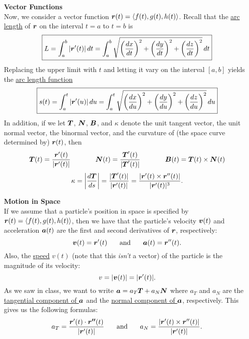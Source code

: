 \documentclass[12pt]{article}
\newcommand{\sectitle}[1]{\vspace{7.5mm}\noindent\textbf{\Large{#1}}\\[3mm]}
\newcommand{\compslong}[3]{\langle #1, #2, #3\rangle}
\begin{document}
	\sectitle{Vector Functions}
	Now, we consider a vector function $\vect{r}(t)=\compslong{f(t)}{g(t)}{h(t)}$. Recall that the \ul{arc length} of $\boldsymbol{r}$ on the interval $t=a$ to $t=b$ is
	$$\boxed{L=\int_a^b|\vect{r}'(t)|\,dt = \int_a^b\sqrt{\left(\frac{dx}{dt}\right)^2+\left(\frac{dy}{dt}\right)^2+\left(\frac{dz}{dt}\right)^2}\,dt}\vspace{3mm}$$
	Replacing the upper limit with $t$ and letting it vary on the interval $[a,b]$ yields the \ul{arc length function}
	$$\boxed{s(t)=\int_a^t|\vect{r}'(u)|\,du= \int_a^t\sqrt{\left(\frac{dx}{du}\right)^2+\left(\frac{dy}{du}\right)^2+\left(\frac{dz}{du}\right)^2}\,du}\vspace{3mm}$$
	In addition, if we let $\boldsymbol{T}$, $\boldsymbol{N}$, $\boldsymbol{B}$, and $\kappa$ denote the unit tangent vector, the unit normal vector, the binormal vector, and the curvature of (the space curve determined by) $\boldsymbol{r}(t)$, then
	$$
		\boldsymbol{T}(t) =\frac{\boldsymbol{r}'(t)}{|\boldsymbol{r}'(t)|} \hspace{0.5in} \boldsymbol{N}(t) = \frac{\boldsymbol{T}'(t)}{|\boldsymbol{T}'(t)|} \hspace{0.5in} \boldsymbol{B}(t) = \boldsymbol{T}(t)\times\boldsymbol{N}(t)$$\vspace{3mm}
	$$
		\kappa=\left|\frac{d\boldsymbol{T}}{ds}\right| = \frac{|\boldsymbol{T}'(t)|}{|\boldsymbol{r}'(t)|} = \frac{|\boldsymbol{r}'(t)\times\boldsymbol{r}''(t)|}{|\boldsymbol{r}'(t)|^3}.
	$$
	
	\sectitle{Motion in Space}
	If we assume that a particle's position in space is specified by $\vect{r}(t)=\compslong{f(t)}{g(t)}{h(t)}$, then we have that the particle's velocity $\boldsymbol{v}(t)$ and acceleration $\boldsymbol{a}(t)$ are the first and second derivatives of $\boldsymbol{r}$, respectively:
	$$\boldsymbol{v}(t)=\boldsymbol{r}'(t)\hspace{0.25in}\text{and}\hspace{0.25in}\boldsymbol{a}(t)=\boldsymbol{r}''(t).$$
	Also, the \ul{speed} $v(t)$ (note that this \textit{isn't} a vector) of the particle is the magnitude of its velocity:
	$$v=|\boldsymbol{v}(t)|=|\boldsymbol{r}'(t)|.$$
	As we saw in class, we want to write $\boldsymbol{a}=a_T\boldsymbol{T}+a_N\boldsymbol{N}$ where $a_T$ and $a_N$ are the \ul{tangential component of $\boldsymbol{a}$} and the \ul{normal component of $\boldsymbol{a}$}, respectively. This gives us the following formulas:
	$$a_T=\frac{\boldsymbol{r}'(t)\cdot\boldsymbol{r''}(t)}{|\boldsymbol{r}'(t)|}\hspace{0.25in}\text{and}\hspace{0.25in}a_N=\frac{|\boldsymbol{r}'(t)\times\boldsymbol{r}''(t)|}{|\boldsymbol{r}'(t)|}.$$
\end{document}
